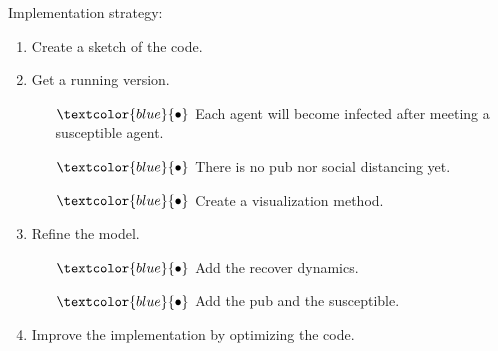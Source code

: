\documentclass[10pt,aspectratio=169]{beamer}
\begin{document}
\begin{frame}{}
Implementation strategy:
\begin{enumerate}
	\item Create a sketch of the code. 
	\item Get a running version.
	\begin{itemize}
		\item[$\textcolor{blue}{\bullet}$] Each agent will become infected after meeting a susceptible agent.
		\item[$\textcolor{blue}{\bullet}$] There is no pub nor social distancing yet.
		\item[$\textcolor{blue}{\bullet}$] Create a visualization method.
	\end{itemize}
	\item Refine the model.
	\begin{itemize}
		\item[$\textcolor{blue}{\bullet}$] Add the recover dynamics.
		\item[$\textcolor{blue}{\bullet}$] Add the pub and the susceptible.
	\end{itemize}
	\item  Improve the implementation by optimizing the code.
\end{enumerate}
\end{frame}
\end{document}
